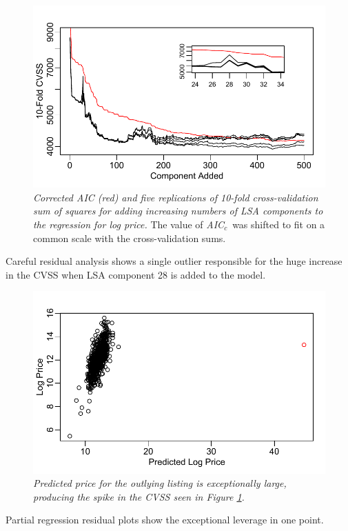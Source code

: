 \documentclass[12pt]{article}
\newcommand{\aicc}{\mbox{\it AIC$_c$}}
\begin{document}
\begin{figure}
\caption{ \label{fig:cvss} {\sl Corrected AIC (red) and five replications of
 10-fold cross-validation sum of squares for adding increasing numbers of LSA
 components to the regression for log price. }  The value of \aicc\ was shifted
 to fit on a common scale with the cross-validation sums.}
  \centerline{ \includegraphics[width=5in]{figures/cvss.pdf} }
\end{figure}


Careful residual analysis shows a single outlier responsible for the huge
increase in the CVSS when LSA component 28 is added to the model.

\begin{figure}
\caption{ \label{fig:calib} {\sl Predicted price for the outlying listing is
exceptionally large, producing the spike in the CVSS seen in Figure
\ref{fig:cvss}.}}
  \centerline{ \includegraphics[width=5in]{figures/calibrate.pdf} }
\end{figure}


Partial regression residual plots show the exceptional leverage in one point.
\end{document}

